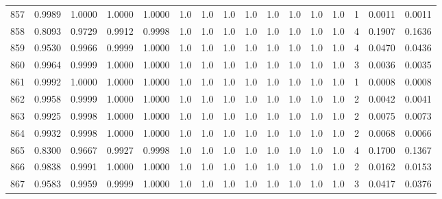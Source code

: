 \begin{tabular}{lrrrrrrrrrrrrrrr}
857 &      0.9989 &  1.0000 &  1.0000 &  1.0000 &     1.0 &     1.0 &     1.0 &     1.0 &     1.0 &     1.0 &      1.0 &        1.0 &      1 &                    0.0011 &                     0.0011 \\
858 &      0.8093 &  0.9729 &  0.9912 &  0.9998 &     1.0 &     1.0 &     1.0 &     1.0 &     1.0 &     1.0 &      1.0 &        1.0 &      4 &                    0.1907 &                     0.1636 \\
859 &      0.9530 &  0.9966 &  0.9999 &  1.0000 &     1.0 &     1.0 &     1.0 &     1.0 &     1.0 &     1.0 &      1.0 &        1.0 &      4 &                    0.0470 &                     0.0436 \\
860 &      0.9964 &  0.9999 &  1.0000 &  1.0000 &     1.0 &     1.0 &     1.0 &     1.0 &     1.0 &     1.0 &      1.0 &        1.0 &      3 &                    0.0036 &                     0.0035 \\
861 &      0.9992 &  1.0000 &  1.0000 &  1.0000 &     1.0 &     1.0 &     1.0 &     1.0 &     1.0 &     1.0 &      1.0 &        1.0 &      1 &                    0.0008 &                     0.0008 \\
862 &      0.9958 &  0.9999 &  1.0000 &  1.0000 &     1.0 &     1.0 &     1.0 &     1.0 &     1.0 &     1.0 &      1.0 &        1.0 &      2 &                    0.0042 &                     0.0041 \\
863 &      0.9925 &  0.9998 &  1.0000 &  1.0000 &     1.0 &     1.0 &     1.0 &     1.0 &     1.0 &     1.0 &      1.0 &        1.0 &      2 &                    0.0075 &                     0.0073 \\
864 &      0.9932 &  0.9998 &  1.0000 &  1.0000 &     1.0 &     1.0 &     1.0 &     1.0 &     1.0 &     1.0 &      1.0 &        1.0 &      2 &                    0.0068 &                     0.0066 \\
865 &      0.8300 &  0.9667 &  0.9927 &  0.9998 &     1.0 &     1.0 &     1.0 &     1.0 &     1.0 &     1.0 &      1.0 &        1.0 &      4 &                    0.1700 &                     0.1367 \\
866 &      0.9838 &  0.9991 &  1.0000 &  1.0000 &     1.0 &     1.0 &     1.0 &     1.0 &     1.0 &     1.0 &      1.0 &        1.0 &      2 &                    0.0162 &                     0.0153 \\
867 &      0.9583 &  0.9959 &  0.9999 &  1.0000 &     1.0 &     1.0 &     1.0 &     1.0 &     1.0 &     1.0 &      1.0 &        1.0 &      3 &                    0.0417 &                     0.0376 \\

\end{tabular}
